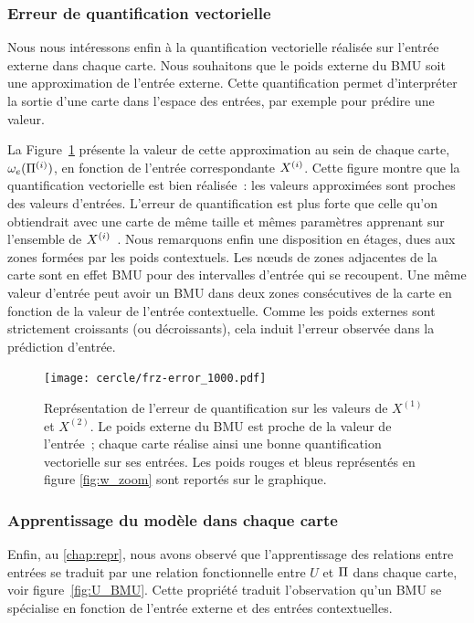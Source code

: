\documentclass[../main]{subfiles}
\begin{document}
\subsubsection{Erreur de quantification vectorielle}

Nous nous intéressons enfin à la quantification vectorielle réalisée sur l'entrée externe dans chaque carte. 
Nous souhaitons que le poids externe du BMU soit une approximation de l'entrée externe. Cette quantification permet d'interpréter la sortie d'une carte dans l'espace des entrées, par exemple pour prédire une valeur.

La Figure~\ref{fig:qv} présente la valeur de cette approximation au sein de chaque carte, $\omega_{e}(\Pi^{({i})})$, en fonction de l'entrée correspondante $X^{({i})}$. 
Cette figure montre que la quantification vectorielle est bien réalisée~: les valeurs approximées sont proches des valeurs d'entrées.
L'erreur de quantification est plus forte que celle qu'on obtiendrait avec une carte de même taille et mêmes paramètres apprenant sur l'ensemble de $X^{({i})}$~. 
Nous remarquons enfin une disposition en étages, dues aux zones formées par les poids contextuels.
Les n\oe{}uds de zones adjacentes de la carte sont en effet BMU pour des intervalles d'entrée qui se recoupent.
Une même valeur d'entrée peut avoir un BMU dans deux zones consécutives de la carte en fonction de la valeur de l'entrée contextuelle. Comme les poids externes sont strictement croissants (ou décroissants), cela induit l'erreur observée dans la prédiction d'entrée.

\begin{figure}[h!]
	\centering\texttt{[image: cercle/frz-error\_1000.pdf]}
	\caption{Représentation de l'erreur de quantification sur les valeurs de $X^{(1)}$ et $X^{(2)}$. Le poids externe du BMU est proche de la valeur de l'entrée~; chaque carte réalise ainsi une bonne quantification vectorielle sur ses entrées. 
	Les poids rouges et bleus représentés en figure \ref{fig:w_zoom} sont reportés sur le graphique. \label{fig:qv}}
\end{figure}

\subsubsection{Apprentissage du modèle dans chaque carte}

Enfin, au \ref{chap:repr}, nous avons observé que l'apprentissage des relations entre entrées se traduit par une relation fonctionnelle entre $U$ et $\Pi$ dans chaque carte, voir figure~\ref{fig:U_BMU}.
Cette propriété traduit l'observation qu'un BMU se spécialise en fonction de l'entrée externe et des entrées contextuelles.
\end{document}
